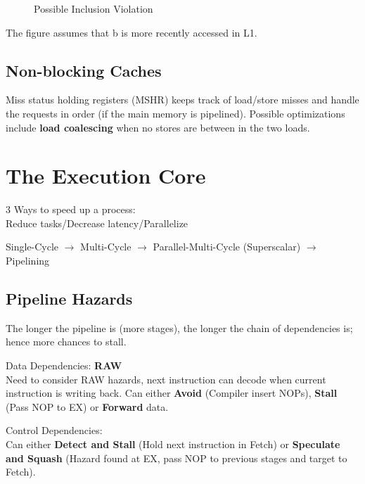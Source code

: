 \documentclass{article}
\begin{document}
\begin{multicols*}{2}
\begin{figure}[H]
  \caption{Possible Inclusion Violation}
\end{figure}

\noindent
The figure assumes that b is more recently accessed in L1.

\subsection*{Non-blocking Caches}
Miss status holding registers (MSHR) keeps track of load/store misses and handle the requests in order (if the main memory is pipelined). Possible optimizations include \textbf{load coalescing} when no stores are between in the two loads.

\section{The Execution Core}
3 Ways to speed up a process:\\
Reduce tasks/Decrease latency/Parallelize
\medskip\par\noindent
Single-Cycle $\rightarrow$ Multi-Cycle $\rightarrow$ Parallel-Multi-Cycle (Superscalar) $\rightarrow$ Pipelining

\subsection*{Pipeline Hazards}
The longer the pipeline is (more stages), the longer the chain of dependencies is; hence more chances to stall.\\
\medskip\par\noindent
Data Dependencies: \textbf{RAW} \\
Need to consider RAW hazards, next instruction can decode when current instruction is writing back. Can either \textbf{Avoid} (Compiler insert NOPs), \textbf{Stall} (Pass NOP to EX) or \textbf{Forward} data.
\medskip\par\noindent
Control Dependencies: \\
Can either \textbf{Detect and Stall} (Hold next instruction in Fetch) or \textbf{Speculate and Squash} (Hazard found at EX, pass NOP to previous stages and target to Fetch).


\end{multicols*}
\end{document}

